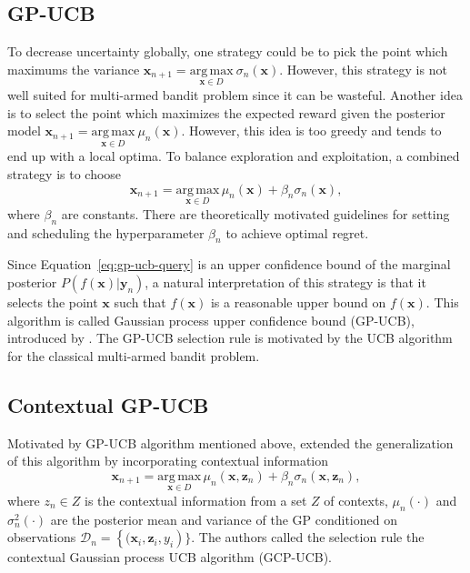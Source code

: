\documentclass{article}
\begin{document}
\subsection{GP-UCB}
To decrease uncertainty globally, one strategy could be to pick the
point which maximums the variance $\mathbf{x}_{n+1}=
\underset{\mathbf{x} \in
  D}{\mathrm{arg\,max}}~\sigma_n(\mathbf{x})$. However, this strategy
is not well suited for multi-armed bandit problem since it can be
wasteful. Another idea is to
select the point which maximizes the expected reward given the
posterior model $\mathbf{x}_{n+1}=
\underset{\mathbf{x} \in
  D}{\mathrm{arg\,max}}~\mu_n(\mathbf{x})$. However, this idea is too
greedy and tends to end up with a local optima. To balance exploration
and exploitation, a combined strategy is to choose
\begin{equation}
  \mathbf{x}_{n+1} = \underset{\mathbf{x} \in D}{\mathrm{arg \,
      max}}\,\mu_n(\mathbf{x})+\beta_n \sigma_n(\mathbf{x}),
\end{equation} \label{eq:gp-ucb-query}
where $\beta_n$ are constants. There are theoretically motivated
guidelines for setting and scheduling the hyperparameter $\beta_n$ to
achieve optimal regret.

Since Equation~\ref{eq:gp-ucb-query} is an upper confidence bound of
the marginal posterior $P(f(\mathbf{x})|\mathbf{y}_n)$, a natural
interpretation of this strategy is that it selects the point
$\mathbf{x}$ such that $f(\mathbf{x})$ is a reasonable upper bound on
$f(\mathbf{x})$. This algorithm is called Gaussian process upper
confidence bound (GP-UCB), introduced by \cite{Srinivas2010-hi}. The
GP-UCB selection rule is motivated by the UCB algorithm for the
classical multi-armed bandit problem.

\subsection{Contextual GP-UCB}
Motivated by GP-UCB algorithm mentioned above, \cite{Krause2011-sb}
extended the generalization of this algorithm by incorporating
contextual information
\begin{equation}
  \mathbf{x}_{n+1} = \underset{\mathbf{x} \in D}{\mathrm{arg \,
      max}}\,\mu_n(\mathbf{x}, \mathbf{z}_n)+\beta_n
  \sigma_n(\mathbf{x}, \mathbf{z}_n),
\end{equation} \label{eq:cgp-ucb-query}
where $z_n \in Z$ is the contextual information from a set $Z$ of
contexts, $\mu_n(\cdot)$ and $\sigma_n^2(\cdot)$ are the posterior mean
and variance of the GP conditioned on observations $\mathcal{D}_n =
\left \{( \mathbf{x}_i, \mathbf{z}_i, y_i \right )\}.$ The authors
called the selection rule the contextual Gaussian process UCB
algorithm (GCP-UCB).
\end{document}

